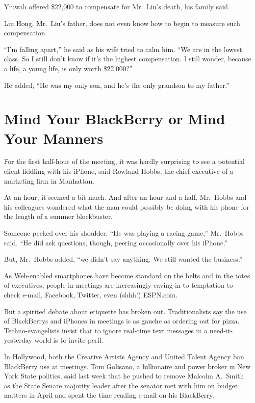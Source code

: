 ﻿\documentclass[12pt,a4paper,onecolumn]{article}
\begin{document}
Yiuwah offered \$22,000 to compensate for Mr.~Liu's death, his family said.

Liu Hong, Mr.~Liu's father, does not even know how to begin to measure such compensation.

``I'm falling apart,'' he said as his wife tried to calm him. ``We are in the lowest class. So I
still don't know if it's the highest compensation. I still wonder, because a life, a young life, is
only worth \$22,000?''

He added, ``He was my only son, and he's the only grandson to my father.''

\section{Mind Your BlackBerry or Mind Your Manners}

For the first half-hour of the meeting, it was hardly surprising to see a potential client fiddling
with his iPhone, said Rowland Hobbs, the chief executive of a marketing firm in Manhattan.

At an hour, it seemed a bit much. And after an hour and a half, Mr.~Hobbs and his colleagues
wondered what the man could possibly be doing with his phone for the length of a summer blockbuster.

Someone peeked over his shoulder. ``He was playing a racing game,'' Mr.~Hobbs said. ``He did ask
questions, though, peering occasionally over his iPhone.''

But, Mr.~Hobbs added, ``we didn't say anything. We still wanted the business.''

As Web-enabled smartphones have become standard on the belts and in the totes of executives, people
in meetings are increasingly caving in to temptation to check e-mail, Facebook, Twitter, even
(shhh!) ESPN.com.

But a spirited debate about etiquette has broken out. Traditionalists say the use of BlackBerrys and
iPhones in meetings is as gauche as ordering out for pizza. Techno-evangelists insist that to ignore
real-time text messages in a need-it-yesterday world is to invite peril.

In Hollywood, both the Creative Artists Agency and United Talent Agency ban BlackBerry use at
meetings. Tom Golisano, a billionaire and power broker in New York State politics, said last week
that he pushed to remove Malcolm A.~Smith as the State Senate majority leader after the senator met
with him on budget matters in April and spent the time reading e-mail on his BlackBerry.
\end{document}
